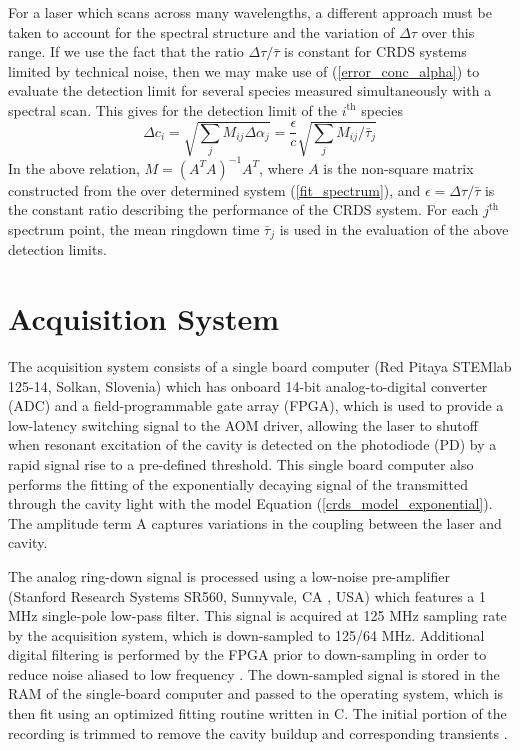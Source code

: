 \documentclass[8pt,a4paper]{report}
\begin{document}
	For a laser which scans across many wavelengths, a different approach must be taken to account for the spectral structure and the variation of $\Delta \tau$ over this range. If we use the fact that the ratio $\Delta \tau / \bar{\tau}$ is constant for CRDS systems limited by technical noise, then we may make use of (\ref{error_conc_alpha}) to evaluate the detection limit for several species measured simultaneously with a spectral scan. This gives for the detection limit of the $i^\mathrm{th}$ species 
	\begin{equation}
		\Delta c_i = \sqrt{\sum_j M_{ij} \Delta \alpha_j} = \frac{\epsilon}{c} \sqrt{\sum_j M_{ij} / \bar{\tau}_j}
	\end{equation}
	In the above relation, $M = (A^TA)^{-1} A^T$, where $A$ is the non-square matrix constructed from the over determined system (\ref{fit_spectrum}), and $\epsilon = \Delta \tau / \bar{\tau}$ is the constant ratio describing the performance of the CRDS system. For each $j^\mathrm{th}$ spectrum point, the mean ringdown time $\bar{\tau}_j$ is used in the evaluation of the above detection limits.
	
	\section{Acquisition System}
	The acquisition system consists of a single
	board computer (Red Pitaya STEMlab 125-14, Solkan, Slovenia) which has onboard 14-bit
	analog-to-digital converter (ADC) and a field-programmable gate array (FPGA), which
	is used to provide a low-latency switching signal to the AOM driver, allowing the laser
	to shutoff when resonant excitation of the cavity is detected on the photodiode (PD) by a
	rapid signal rise to a pre-defined threshold. This single board computer also performs the
	fitting of the exponentially decaying signal of the transmitted through the cavity light with
	the model Equation (\ref{crds_model_exponential}). The amplitude term A captures variations in the coupling between the laser and cavity.
	
	The analog ring-down signal is processed using a low-noise pre-amplifier (Stanford
	Research Systems SR560, Sunnyvale, CA , USA) which features a 1 MHz single-pole low-pass filter. This signal is acquired at 125 MHz sampling rate by the acquisition system, which
	is down-sampled to 125/64 MHz. Additional digital filtering is performed by the FPGA
	prior to down-sampling in order to reduce noise aliased to low frequency \cite{frontiers_mol_spec}. The down-sampled signal is stored in the RAM of the single-board computer and passed to the
	operating system, which is then fit using an optimized fitting routine written in C. The initial
	portion of the recording is trimmed to remove the cavity buildup and corresponding
	transients \cite{frontiers_mol_spec}.
	
\end{document}
